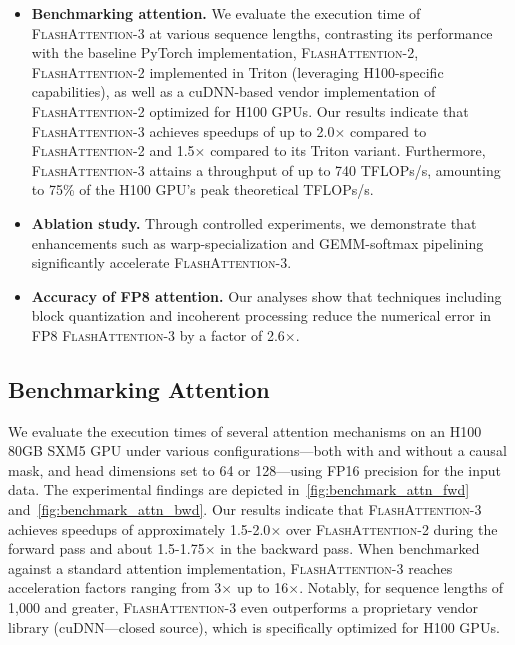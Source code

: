 \begin{itemize}

\item \textbf{Benchmarking attention.} We evaluate the execution time of \textsc{FlashAttention-3} at various sequence lengths, contrasting its performance with the baseline PyTorch implementation, \textsc{FlashAttention-2}, \textsc{FlashAttention-2} implemented in Triton (leveraging H100-specific capabilities), as well as a cuDNN-based vendor implementation of \textsc{FlashAttention-2} optimized for H100 GPUs. Our results indicate that \textsc{FlashAttention-3} achieves speedups of up to 2.0$\times$ compared to \textsc{FlashAttention-2} and 1.5$\times$ compared to its Triton variant. Furthermore, \textsc{FlashAttention-3} attains a throughput of up to 740 TFLOPs/s, amounting to 75\% of the H100 GPU’s peak theoretical TFLOPs/s.
\item \textbf{Ablation study.} Through controlled experiments, we demonstrate that enhancements such as warp-specialization and GEMM-softmax pipelining significantly accelerate \textsc{FlashAttention-3}.
\item \textbf{Accuracy of FP8 attention.} Our analyses show that techniques including block quantization and incoherent processing reduce the numerical error in FP8 \textsc{FlashAttention-3} by a factor of 2.6$\times$.
\end{itemize}

\subsection{Benchmarking Attention}
\label{subsec:benchmark_attn}

We evaluate the execution times of several attention mechanisms on an H100 80GB SXM5 GPU under various configurations—both with and without a causal mask, and head dimensions set to 64 or 128—using FP16 precision for the input data. The experimental findings are depicted in~\cref{fig:benchmark_attn_fwd} and~\cref{fig:benchmark_attn_bwd}. Our results indicate that \textsc{FlashAttention-3} achieves speedups of approximately 1.5-2.0$\times$ over \textsc{FlashAttention-2} during the forward pass and about 1.5-1.75$\times$ in the backward pass. When benchmarked against a standard attention implementation, \textsc{FlashAttention-3} reaches acceleration factors ranging from 3$\times$ up to 16$\times$. Notably, for sequence lengths of 1,000 and greater, \textsc{FlashAttention-3} even outperforms a proprietary vendor library (cuDNN—closed source), which is specifically optimized for H100 GPUs.


